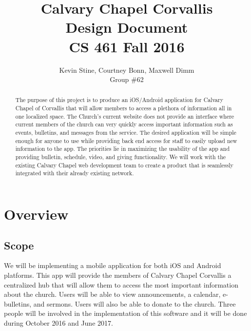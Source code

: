 \documentclass[letterpaper,10pt,draftclsnofoot,onecolumn,titlepage]{IEEEtran}
\def\name{Kevin Stine, Courtney Bonn, Maxwell Dimm}
\def\team{Calvary Chapel Corvallis}
\def\grp{Group \#62}
\begin{document}
	\title{\huge \team \\ Design Document \\ CS 461 Fall 2016}
	\author{\large \name \\ \grp}

	

	\maketitle

	
		\begin{abstract}The purpose of this project is to produce an iOS/Android application for Calvary Chapel of Corvallis that will allow members to access a plethora of information all in one localized space.
		The Church's current website does not provide an interface where current members of the church can very quickly access important information such as events, bulletins, and messages from the service.
		The desired application will be simple enough for anyone to use while providing back end access for staff to easily upload new information to the app.
		The priorities lie in maximizing the usability of the app and providing bulletin, schedule, video, and giving functionality.
		We will work with the existing Calvary Chapel web development team to create a product that is seamlessly integrated with their already existing network.
		\end{abstract}


	\clearpage

	\tableofcontents

	\clearpage
	
	\section{Overview}
	
		\subsection{Scope}
			We will be implementing a mobile application for both iOS and Android platforms. 
			This app will provide the members of Calvary Chapel Corvallis a centralized hub that will allow them to access the most important information about the church. 
			Users will be able to view announcements, a calendar, e-bulletins, and sermons. 
			Users will also be able to donate to the church. 
			Three people will be involved in the implementation of this software and it will be done during October 2016 and June 2017. 
		
\end{document}
